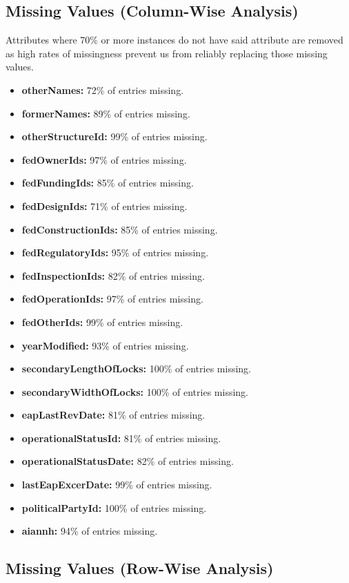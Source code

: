 \documentclass{article}
\begin{document}
\subsection{Missing Values (Column-Wise Analysis)}
Attributes where 70\% or more instances do not have said attribute are removed as high rates of missingness prevent us from reliably replacing those missing values. 

\begin{itemize}
    \item \textbf{otherNames:} 72\% of entries missing.
    \item \textbf{formerNames:} 89\% of entries missing.
    \item \textbf{otherStructureId:} 99\% of entries missing.
    \item \textbf{fedOwnerIds:} 97\% of entries missing.
    \item \textbf{fedFundingIds:} 85\% of entries missing.
    \item \textbf{fedDesignIds:} 71\% of entries missing.
    \item \textbf{fedConstructionIds:} 85\% of entries missing.
    \item \textbf{fedRegulatoryIds:} 95\% of entries missing.
    \item \textbf{fedInspectionIds:} 82\% of entries missing.
    \item \textbf{fedOperationIds:} 97\% of entries missing.
    \item \textbf{fedOtherIds:} 99\% of entries missing.
    \item \textbf{yearModified:} 93\% of entries missing.
    \item \textbf{secondaryLengthOfLocks:} 100\% of entries missing.
    \item \textbf{secondaryWidthOfLocks:} 100\% of entries missing.
    \item \textbf{eapLastRevDate:} 81\% of entries missing.
    \item \textbf{operationalStatusId:} 81\% of entries missing.
    \item \textbf{operationalStatusDate:} 82\% of entries missing.
    \item \textbf{lastEapExcerDate:} 99\% of entries missing.
    \item \textbf{politicalPartyId:} 100\% of entries missing.
    \item \textbf{aiannh:} 94\% of entries missing.
\end{itemize}

\subsection{Missing Values (Row-Wise Analysis)}
\end{document}
